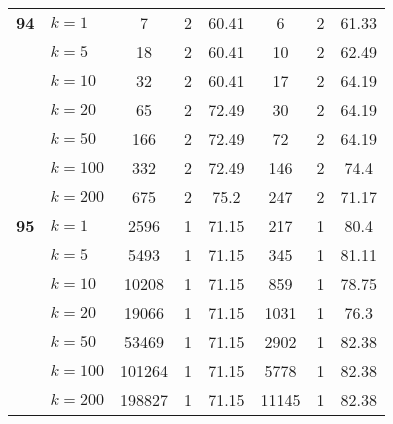 \begin{table}[htbp]
\begin{tabular}{|l|l|c|c|c|c|c|c|}
    \multicolumn{1}{|r|}{\textbf{94}} & $k=1$ & 7 & 2 & 60.41 & 6 & 2 & 61.33 \\ 
     & $k=5$ & 18 & 2 & 60.41 & 10 & 2 & 62.49 \\ 
     & $k=10$ & 32 & 2 & 60.41 & 17 & 2 & 64.19 \\ 
     & $k=20$ & 65 & 2 & 72.49 & 30 & 2 & 64.19 \\ 
     & $k=50$ & 166 & 2 & 72.49 & 72 & 2 & 64.19 \\ 
     & $k=100$ & 332 & 2 & 72.49 & 146 & 2 & 74.4 \\ 
     & $k=200$ & 675 & 2 & 75.2 & 247 & 2 & 71.17 \\ \hline
    \multicolumn{1}{|r|}{\textbf{95}} & $k=1$ & 2596 & 1 & 71.15 & 217 & 1 & 80.4 \\ 
     & $k=5$ & 5493 & 1 & 71.15 & 345 & 1 & 81.11 \\ 
     & $k=10$ & 10208 & 1 & 71.15 & 859 & 1 & 78.75 \\ 
     & $k=20$ & 19066 & 1 & 71.15 & 1031 & 1 & 76.3 \\ 
     & $k=50$ & 53469 & 1 & 71.15 & 2902 & 1 & 82.38 \\ 
     & $k=100$ & 101264 & 1 & 71.15 & 5778 & 1 & 82.38 \\ 
     & $k=200$ & 198827 & 1 & 71.15 & 11145 & 1 & 82.38 \\ \hline
    \end{tabular}
\end{table}
